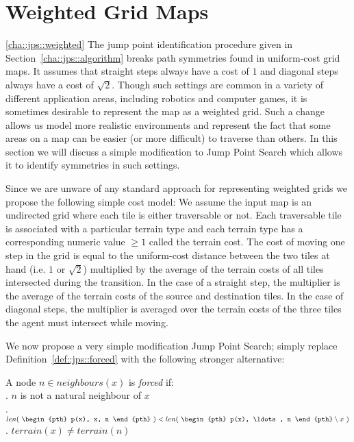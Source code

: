 \section{Weighted Grid Maps}
\ref{cha::jps::weighted}
The jump point identification procedure given in
Section~\ref{cha::jps::algorithm} breaks path symmetries found in uniform-cost
grid maps. It assumes that straight steps always have a cost of $1$ and
diagonal steps always have a cost of $\sqrt{2}$.  Though such settings are
common in a variety of different application areas, including robotics and
computer games, it is sometimes desirable to represent the map as a weighted
grid. Such a change allows us model more realistic environments and represent
the fact that some areas on a map can be easier (or more difficult) to
traverse than others.  In this section we will discuss a simple modification
to  Jump Point Search which allows it to identify symmetries in such settings.

Since we are unware of any standard approach for representing weighted grids
we propose the following simple cost model:
We assume the input map is an undirected grid where each tile is either
traversable or not.  Each traversable tile is associated with a particular
terrain type and each terrain type has a corresponding numeric value 
$\ge 1$ called the terrain cost.
The cost of moving one step in the grid is equal to the uniform-cost
distance between the two tiles at hand (i.e. $1$ or $\sqrt{2}$) multiplied by
the average of the terrain costs of all tiles intersected during the
transition.  In the case of a straight step, the multiplier is the average of
the terrain costs of the source and destination tiles. In the case of diagonal
steps, the multiplier is averaged over the terrain costs of the three tiles
the agent must intersect while moving.

We now propose a very simple modification Jump Point Search; 
simply replace Definition~\ref{def::jps::forced} with the following
stronger alternative:

\begin{definition}
\label{def::jps::wforced}
A node $n \in neighbours(x)$ is \emph{forced} if: \\
. $n$ is not a natural neighbour of $x$\\
. $ len(~\begin{pth} p(x), x, n \end{pth}~) < len(~ \begin{pth} p(x), \ldots, n \end{pth} \setminus x~)$ \\
. $terrain(x) \neq terrain(n)$
\end{definition}

